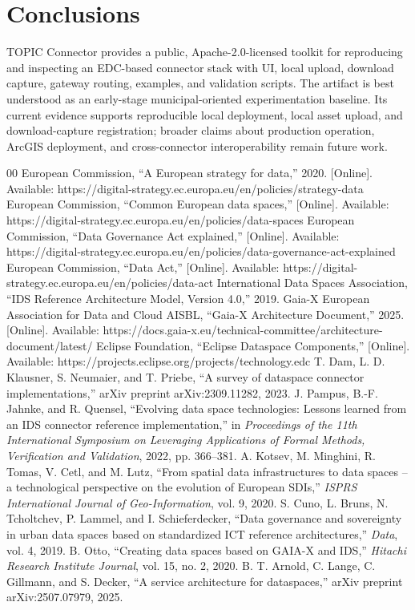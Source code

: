 \documentclass[preprint,12pt]{elsarticle}
\begin{document}
\section{Conclusions}
TOPIC Connector provides a public, Apache-2.0-licensed toolkit for reproducing and inspecting an EDC-based connector stack with UI, local upload, download capture, gateway routing, examples, and validation scripts. The artifact is best understood as an early-stage municipal-oriented experimentation baseline. Its current evidence supports reproducible local deployment, local asset upload, and download-capture registration; broader claims about production operation, ArcGIS deployment, and cross-connector interoperability remain future work.

\begin{thebibliography}{00}
 European Commission, ``A European strategy for data,'' 2020. [Online]. Available: https://digital-strategy.ec.europa.eu/en/policies/strategy-data
 European Commission, ``Common European data spaces,'' [Online]. Available: https://digital-strategy.ec.europa.eu/en/policies/data-spaces
 European Commission, ``Data Governance Act explained,'' [Online]. Available: https://digital-strategy.ec.europa.eu/en/policies/data-governance-act-explained
 European Commission, ``Data Act,'' [Online]. Available: https://digital-strategy.ec.europa.eu/en/policies/data-act
 International Data Spaces Association, ``IDS Reference Architecture Model, Version 4.0,'' 2019.
 Gaia-X European Association for Data and Cloud AISBL, ``Gaia-X Architecture Document,'' 2025. [Online]. Available: https://docs.gaia-x.eu/technical-committee/architecture-document/latest/
 Eclipse Foundation, ``Eclipse Dataspace Components,'' [Online]. Available: https://projects.eclipse.org/projects/technology.edc
 T. Dam, L. D. Klausner, S. Neumaier, and T. Priebe, ``A survey of dataspace connector implementations,'' arXiv preprint arXiv:2309.11282, 2023.
 J. Pampus, B.-F. Jahnke, and R. Quensel, ``Evolving data space technologies: Lessons learned from an IDS connector reference implementation,'' in \textit{Proceedings of the 11th International Symposium on Leveraging Applications of Formal Methods, Verification and Validation}, 2022, pp. 366--381.
 A. Kotsev, M. Minghini, R. Tomas, V. Cetl, and M. Lutz, ``From spatial data infrastructures to data spaces -- a technological perspective on the evolution of European SDIs,'' \textit{ISPRS International Journal of Geo-Information}, vol. 9, 2020.
 S. Cuno, L. Bruns, N. Tcholtchev, P. Lammel, and I. Schieferdecker, ``Data governance and sovereignty in urban data spaces based on standardized ICT reference architectures,'' \textit{Data}, vol. 4, 2019.
 B. Otto, ``Creating data spaces based on GAIA-X and IDS,'' \textit{Hitachi Research Institute Journal}, vol. 15, no. 2, 2020.
 B. T. Arnold, C. Lange, C. Gillmann, and S. Decker, ``A service architecture for dataspaces,'' arXiv preprint arXiv:2507.07979, 2025.
\end{thebibliography}
\end{document}
